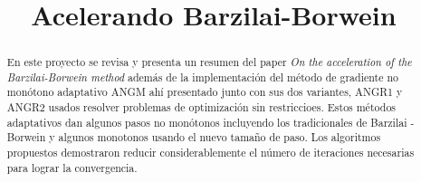 \documentclass[conference]{IEEEtran}
\begin{document}
\title{Acelerando Barzilai-Borwein}

\author{
}

\maketitle

\begin{abstract}
    En este proyecto se revisa y presenta un resumen del paper \textit{On the acceleration of the Barzilai-Borwein method} además de la implementación del método de gradiente no monótono adaptativo ANGM ahí presentado junto con sus dos variantes, ANGR1 y ANGR2 usados resolver problemas de optimización sin restriccioes. Estos métodos adaptativos dan algunos pasos no monótonos incluyendo los tradicionales de Barzilai - Borwein y algunos monotonos usando el nuevo tamaño de paso. Los algoritmos propuestos demostraron reducir considerablemente el número de iteraciones necesarias para lograr la convergencia.

    \end{abstract}



    \IEEEpeerreviewmaketitle
\end{document}
